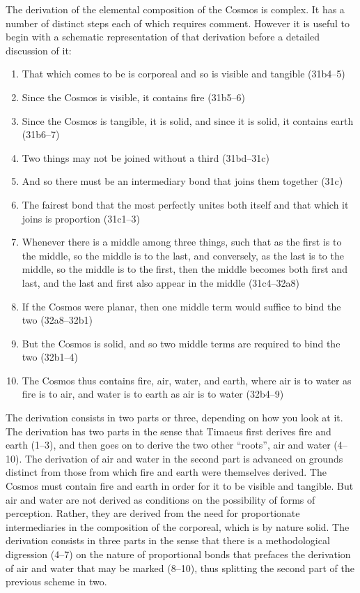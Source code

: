 The derivation of the elemental composition of the Cosmos is complex. It has a number of distinct steps each of which requires comment. However it is useful to begin with a schematic representation of that derivation before a detailed discussion of it:
\begin{enumerate}[(1)]
	\item That which comes to be is corporeal and so is visible and tangible (31b4--5)
	\item Since the Cosmos is visible, it contains fire (31b5--6)
	\item Since the Cosmos is tangible, it is solid, and since it is solid, it contains earth (31b6--7)
	\item Two things may not be joined without a third (31bd--31c)
	\item And so there must be an intermediary bond that joins them together (31c)
	\item The fairest bond that the most perfectly unites both itself and that which it joins is proportion (31c1--3)
	\item Whenever there is a middle among three things, such that as the first is to the middle, so the middle is to the last, and conversely, as the last is to the middle, so the middle is to the first, then the middle becomes both first and last, and the last and first also appear in the middle (31c4--32a8)
	\item If the Cosmos were planar, then one middle term would suffice to bind the two (32a8--32b1)
	\item But the Cosmos is solid, and so two middle terms are required to bind the two (32b1--4)
	\item The Cosmos thus contains fire, air, water, and earth, where air is to water as fire is to air, and water is to earth as air is to water (32b4--9)
\end{enumerate}
The derivation consists in two parts or three, depending on how you look at it. The derivation has two parts in the sense that Timaeus first derives fire and earth (1--3), and then goes on to derive the two other ``roots'', air and water (4--10). The derivation of air and water in the second part is advanced on grounds distinct from those from which fire and earth were themselves derived. The Cosmos must contain fire and earth in order for it to be visible and tangible. But air and water are not derived as conditions on the possibility of forms of perception. Rather, they are derived from the need for proportionate intermediaries in the composition of the corporeal, which is by nature solid. The derivation consists in three parts in the sense that there is a methodological digression (4--7) on the nature of proportional bonds that prefaces the derivation of air and water that may be marked (8--10), thus splitting the second part of the previous scheme in two.


